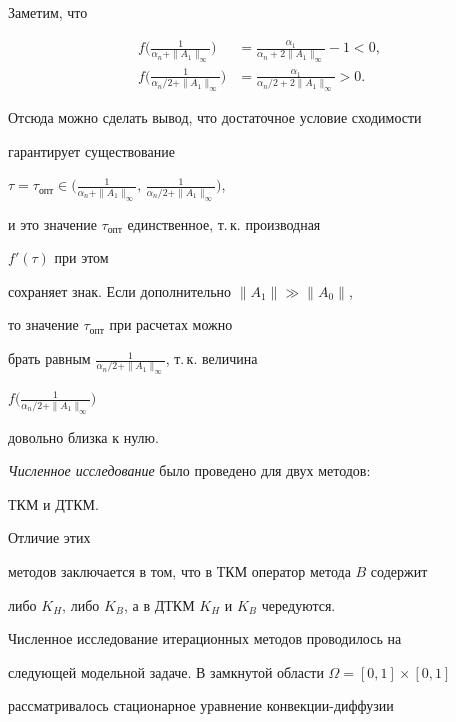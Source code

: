  


Заметим, что 


\begin{align*} 


f\bigg(\frac{1}{\alpha_n+\|A_1\|_\infty} \bigg)&= 


\frac{\alpha_1}{\alpha_n+2\|A_1\|_\infty}-1<0,\\ 


f\bigg(\frac{1}{\alpha_n/2+\|A_1\|_\infty} \bigg)&= 


\frac{\alpha_1}{\alpha_n/2+2\|A_1\|_\infty}>0. 


\end{align*} 


Отсюда можно сделать вывод, что достаточное условие сходимости 


гарантирует существование 


$\tau=\tau_{\text{опт}}\in\big(\frac{1}{\alpha_n+\|A_1\|_\infty},\, 


\frac{1}{\alpha_n/2+\|A_1\|_\infty}\big)$, 


и это значение $\tau_{\text{опт}}$ единственное, т.\,к. производная 


$f'(\tau)$ при этом  


сохраняет знак. Если дополнительно $\|A_1\|\gg\|A_0\|$, 


то значение $\tau_{\text{опт}}$ при расчетах можно 


брать равным $\frac{1}{\alpha_n/2+\|A_1\|_\infty}$, т.\,к. величина 


$f\big(\frac{1}{\alpha_n/2+\|A_1\|_\infty}\big)$ 


довольно близка к нулю. 


 


{\it Численное исследование} было проведено для двух методов: 


ТКМ и ДТКМ. 


Отличие этих 


методов заключается в том, что в ТКМ оператор метода $B$ содержит 


либо $K_H$, либо $K_B$, а в ДТКМ $K_H$ и $K_B$ чередуются. 


 


Численное исследование итерационных методов проводилось на  


следующей модельной задаче. В замкнутой области $\Omega=[0,1]\times[0,1]$ 


рассматривалось стационарное уравнение конвекции-диффузии 


